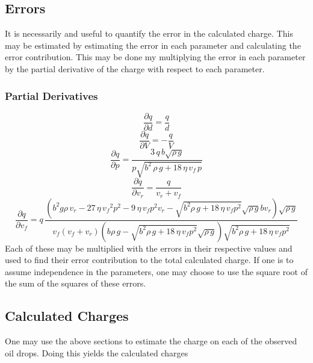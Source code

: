 \documentclass[]{article}
\begin{document}
\subsection{   Errors}
It is necessarily and useful to quantify the error in the calculated charge. This may be estimated by estimating the error in each parameter and calculating the error contribution. This may be done my multiplying the error in each parameter by the partial derivative of the charge with respect to each parameter.
\subsubsection{Partial Derivatives}
\begin{equation}
\frac{\partial q}{\partial d } = \frac{q}{d}
\end{equation}
\begin{equation}
\frac{\partial q}{\partial V } = -\frac{q}{V}
\end{equation}
\begin{equation}
\frac{\partial q}{\partial p } = \frac{3 \, q \, b \sqrt{\rho \, g}}{ p \sqrt{b^2 \, \rho \, g +	18 \, \eta \, v_f \, p }}
\end{equation}
\begin{equation}
\frac{\partial q}{\partial v_r } = \frac{q}{v_r+v_f}
\end{equation}
\begin{equation}
\frac{\partial q}{\partial v_f } = q\, {\frac { \left( {b}^{2}g\rho\,v_{r}-27\,\eta\,{v_{f}}^{2}{p}^{2}-9
		\,\eta\,v_{{f}}{p}^{2}v_{{r}}-\sqrt {{b}^{2}\rho\,g+18\,\eta\,v_{{f}}{
				p}^{2}}\sqrt {\rho \, g}bv_{{r}} \right) \sqrt {\rho \, g}}{v_
		{{f}} \left( v_{{f}}+v_{{r}} \right)  \left( b\rho\,g-\sqrt {{b}^{2}
			\rho\,g+18\,\eta\,v_{{f}}{p}^{2}}\sqrt {\rho \, g} \right) \sqrt {
			{b}^{2}\rho\,g+18\,\eta\,v_{{f}}{p}^{2}}}}
\end{equation}
Each of these may be multiplied with the errors in their respective values and used to find their error contribution to the total calculated charge. If one is to assume independence in the parameters, one may choose to use the square root of the sum of the squares of these errors.
\subsection{Calculated Charges}
One may use the above sections to estimate the charge on each of the observed oil drops. Doing this yields the calculated charges
\end{document}
